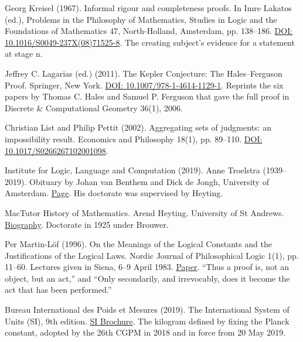 \noindent Georg Kreisel (1967). Informal rigour and completeness proofs. In Imre Lakatos (ed.), Problems in the Philosophy of Mathematics, Studies in Logic and the Foundations of Mathematics 47, North-Holland, Amsterdam, pp. 138--186. \href{https://doi.org/10.1016/S0049-237X(08)71525-8}{DOI: 10.1016/S0049-237X(08)71525-8}. The creating subject's evidence for a statement at stage n.
\par\medskip

\noindent Jeffrey C. Lagarias (ed.) (2011). The Kepler Conjecture: The Hales--Ferguson Proof. Springer, New York. \href{https://doi.org/10.1007/978-1-4614-1129-1}{DOI: 10.1007/978-1-4614-1129-1}. Reprints the six papers by Thomas C. Hales and Samuel P. Ferguson that gave the full proof in Discrete \& Computational Geometry 36(1), 2006.
\par\medskip

\noindent Christian List and Philip Pettit (2002). Aggregating sets of judgments: an impossibility result. Economics and Philosophy 18(1), pp. 89--110. \href{https://doi.org/10.1017/S0266267102001098}{DOI: 10.1017/S0266267102001098}.
\par\medskip

\noindent Institute for Logic, Language and Computation (2019). Anne Troelstra (1939--2019). Obituary by Johan van Benthem and Dick de Jongh, University of Amsterdam. \href{https://www.illc.uva.nl/NewsandEvents/News/Obituaries/Anne-Troelstra-1939-2019-/}{Page}. His doctorate was supervised by Heyting.
\par\medskip

\noindent MacTutor History of Mathematics. Arend Heyting. University of St Andrews. \href{https://mathshistory.st-andrews.ac.uk/Biographies/Heyting/}{Biography}. Doctorate in 1925 under Brouwer.
\par\medskip

\noindent Per Martin-L\"of (1996). On the Meanings of the Logical Constants and the Justifications of the Logical Laws. Nordic Journal of Philosophical Logic 1(1), pp. 11--60. Lectures given in Siena, 6--9 April 1983. \href{https://ncatlab.org/nlab/files/MartinLofOnTheMeaning96.pdf}{Paper}. ``Thus a proof is, not an object, but an act,'' and ``Only secondarily, and irrevocably, does it become the act that has been performed.''
\par\medskip

\noindent Bureau International des Poids et Mesures (2019). The International System of Units (SI), 9th edition. \href{https://www.bipm.org/en/publications/si-brochure}{SI Brochure}. The kilogram defined by fixing the Planck constant, adopted by the 26th CGPM in 2018 and in force from 20 May 2019.
\par\medskip

